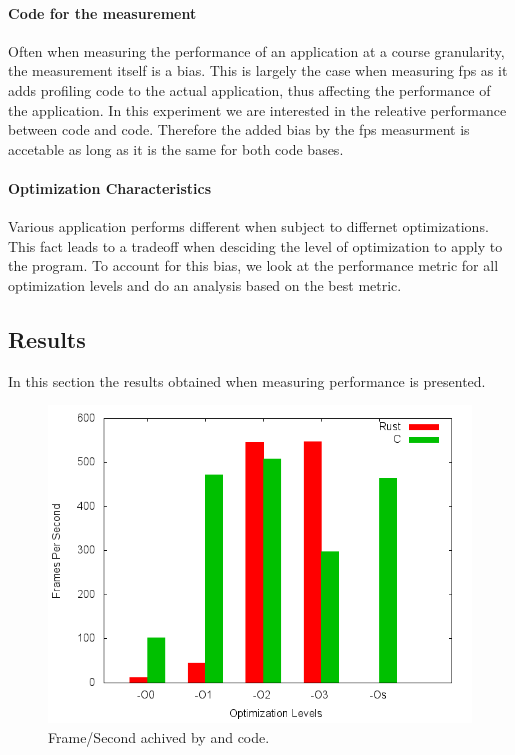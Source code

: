 \paragraph{Code for the measurement}
Often when measuring the performance of an application at a course granularity, the measurement itself is a bias.
This is largely the case when measuring \gls{fps} as it adds profiling code to the actual application, thus affecting the performance of the application.
In this experiment we are interested in the releative performance between {\C} code and {\rust} code.
Therefore the added bias by the \gls{fps} measurment is accetable as long as it is the same for both code bases.

\paragraph{Optimization Characteristics}
Various application performs different when subject to differnet optimizations.
This fact leads to a tradeoff when desciding the level of optimization to apply to the program.
To account for this bias, we look at the performance metric for all optimization levels and do an analysis based on the best metric.

\subsection{Results}
\label{sec:perf:res}

In this section the results obtained when measuring performance is presented.

\begin{figure}[H]
  \begin{center}
    \includegraphics[scale=0.5]{results/plots/perf/perf.png}
  \end{center}
  \caption{Frame/Second achived by {\C} and {\rust} code.}
  \label{fig:perf:res}
\end{figure}

